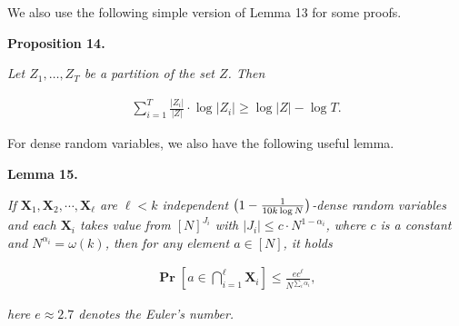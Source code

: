\documentclass[10pt,a4paper]{article}
\begin{document}



We also use the following simple version of Lemma 13 for some proofs.\par





\par\medskip\noindent\textbf{
\textbf{Proposition 14}\textbf{.}
}\par



\emph{Let $Z_{1},\dots,Z_{T}$ be a partition of the set $Z$.
Then}\par


\[\begin{gathered}
\sum_{i=1}^{T}\frac{\left|Z_{i}\right|}{\left|Z\right|}\cdot\log\left|Z_{i}\right|\geq\log\left|Z\right|-\log T.
\end{gathered}\]






For dense random variables, we also have the following useful lemma.\par





\par\medskip\noindent\textbf{
\textbf{Lemma 15}\textbf{.}
}\par



\emph{If $\bm{X}_{1},\bm{X}_{2},\cdots,\bm{X}_{\ell}$ are $\ell<k$ independent $\big{(}1-\frac{1}{10k\log N}\big{)}$-dense random variables and each $\bm{X}_{i}$ takes value from $[N]^{J_{i}}$ with $|J_{i}|\leq c\cdot N^{1-\alpha_{i}}$, where $c$ is a constant and $N^{\alpha_{i}}=\omega(k)$, then for any element $a\in[N]$, it holds}\par


\[\begin{gathered}
\operatorname*{\mathbf{Pr}}\left[a\in\bigcap_{i=1}^{\ell}\bm{X}_{i}\right]\leq\frac{ec^{\ell}}{N^{\sum_{i}\alpha_{i}}},
\end{gathered}\]


\emph{here $e\approx 2.7$ denotes the Euler’s number.}\par



\end{document}
